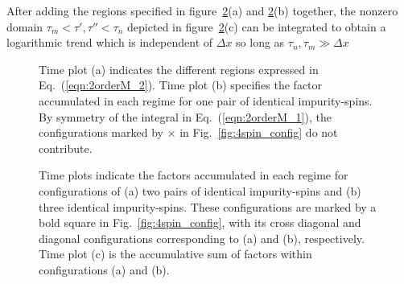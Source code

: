 \documentclass[aps,prb,twocolumn,superscriptaddress]{revtex4-1}
\begin{document}
\begin{widetext}

After adding the regions specified in figure~\ref{fig:2a3pair}(a) and \ref{fig:2a3pair}(b) together, the nonzero domain $\tau_{m}<\tau',\tau''<\tau_{n}$ depicted in figure~\ref{fig:2a3pair}(c) can be integrated to obtain a logarithmic trend which is independent of $\Delta{x}$ so long as $\tau_{n},\tau_{m}\gg\Delta{x}$

\begin{figure}[!ht]
	\caption{Time plot (a) indicates the different regions expressed in Eq.~(\ref{eqn:2orderM_2}). Time plot (b) specifies the factor accumulated in each regime for one pair of identical impurity-spins. By symmetry of the integral in Eq.~(\ref{eqn:2orderM_1}), the configurations marked by $\times$ in Fig.~\ref{fig:4spin_config} do not contribute.}
	\label{fig:1pair} 
\end{figure}

\begin{figure}[!ht]
	\caption{Time plots indicate the factors accumulated in each regime for configurations of (a) two pairs of identical impurity-spins and (b) three identical impurity-spins. These configurations are marked by a bold square in Fig.~\ref{fig:4spin_config}, with its cross diagonal and diagonal configurations corresponding to (a) and (b), respectively. Time plot (c) is the accumulative sum of factors within configurations (a) and (b).}
	\label{fig:2a3pair} 
\end{figure}


\end{widetext}
\end{document}
